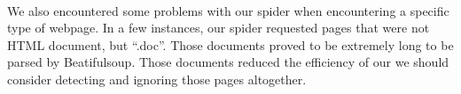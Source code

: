 \documentclass[]{article}
\begin{document}
\paragraph{}
We also encountered some problems with our spider when encountering a specific type of webpage. In a  few instances, our spider requested pages that were not HTML document, but ``.doc''. Those documents proved to be extremely long to be parsed by Beatifulsoup. Those documents reduced the efficiency of our we should consider detecting and ignoring those pages altogether.
\end{document}

